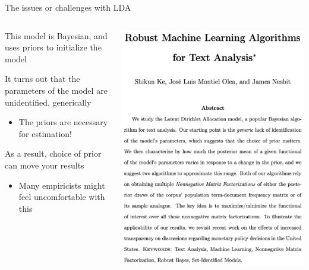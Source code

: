 \documentclass[notes,11pt, aspectratio=169]{beamer}
\newenvironment{wideitemize}{\itemize\addtolength{\itemsep}{10pt}}{\enditemize}
\begin{document}
  \begin{frame}{The issues or challenges with LDA}
    \begin{columns}[onlytextwidth, T] %
      \begin{column}{.5\textwidth}
    \begin{wideitemize}
    \item This model is Bayesian, and uses priors to initialize the model
    \item It turns out that the parameters of the model are
      unidentified, generically
      \begin{itemize}
      \item The priors are necessary for estimation!
      \end{itemize}
    \item As a result, choice of prior can move your results 
      \begin{itemize}
      \item Many empiricists might feel uncomfortable with this
      \end{itemize}
    \end{wideitemize}
      \end{column}%
      \hfill%
      \begin{column}{.5\textwidth}
        \includegraphics[width=\linewidth]{images/pepe_1.png}
      \end{column}%
    \end{columns}
  \end{frame}
\end{document}
